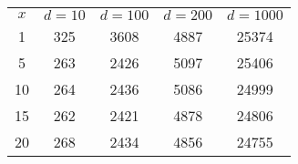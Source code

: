 \begin{tabular}{ccccc}
\hline
 $x$ & $d=10$ & $d=100$ & $d=200$ & $d=1000$ \\
 1 &325 &3608 &4887 &25374\\
 5 &263 &2426 &5097 &25406\\
10 &264 &2436 &5086 &24999\\
15 &262 &2421 &4878 &24806\\
20 &268 &2434 &4856 &24755\\
\hline
\end{tabular}
